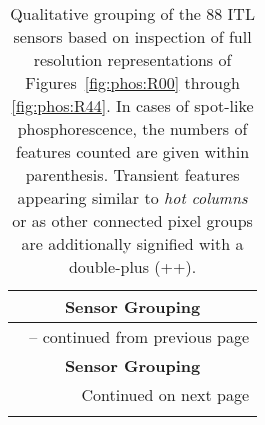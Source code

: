 \begin{center}
\begin{longtable}{lll}
\caption[Qualitative grouping of ITL sensors]{
    Qualitative grouping of the 88 ITL sensors based on inspection of full resolution representations 
    of Figures~\ref{fig:phos:R00} through \ref{fig:phos:R44}. In cases of spot-like phosphorescence, 
    the numbers of features counted are given within parenthesis. Transient features appearing similar to 
    \textit{hot columns} or as other connected pixel groups are additionally signified with a double-plus (++).
} \label{qualitative_assessment:itl_sensors} \\
\toprule
\multicolumn{3}{c}{\textbf{Sensor Grouping}} \\
\midrule
\endfirsthead

\multicolumn{3}{c}{{\tablename\ \thetable{} -- continued from previous page}} \\
\toprule
\multicolumn{3}{c}{\textbf{Sensor Grouping}} \\
\midrule
\endhead

\midrule
\multicolumn{3}{r}{{Continued on next page}} \\
\bottomrule
\endfoot

\bottomrule
\endlastfoot


\end{longtable}
\end{center}
